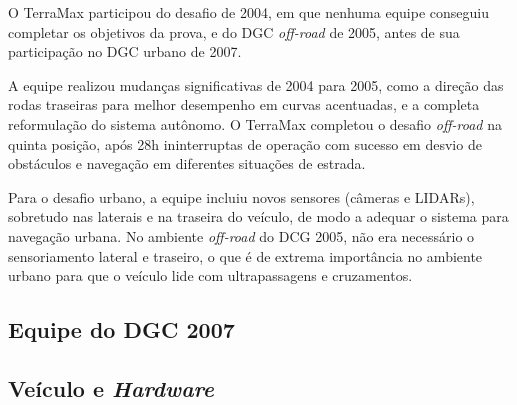 O TerraMax participou do desafio de 2004, em que nenhuma equipe conseguiu completar os objetivos da prova, e do DGC \emph{off-road} de 2005, antes de sua participação no DGC urbano de 2007.

A equipe realizou mudanças significativas de 2004 para 2005, como a direção das rodas traseiras para melhor desempenho em curvas acentuadas, e a completa reformulação do sistema autônomo. O TerraMax completou o desafio \emph{off-road} na quinta posição, após 28h ininterruptas de operação com sucesso em desvio de obstáculos e navegação em diferentes situações de estrada.

Para o desafio urbano, a equipe incluiu novos sensores (câmeras e LIDARs), sobretudo nas laterais e na traseira do veículo, de modo a adequar o sistema para navegação urbana. No ambiente \emph{off-road} do DCG 2005, não era necessário o sensoriamento lateral e traseiro, o que é de extrema importância no ambiente urbano para que o veículo lide com ultrapassagens e cruzamentos.

\subsection{Equipe do DGC 2007}

\subsection{Veículo e \emph{Hardware}}
